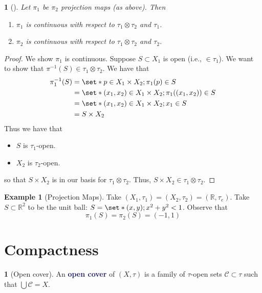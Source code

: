 \documentclass[11pt]{article}
\numberwithin{equation}{section}
\newcommand{\navy}[1]{\textcolor{MidnightBlue}{\bf #1}}
\theoremstyle{plain}
\newtheorem{claim}{\color{ForestGreen}{\textbf{Claim}}}[section]
\theoremstyle{definition}
\newtheorem{definition}{\color{MidnightBlue}{\textbf{Definition}}}[section]
\newtheorem{example}{\color{WildStrawberry}Example}[section]
\def\Set{\set*}%
\def\ss{\subset}
\newcommand{\1}{\mathbbm 1}
\def\t{\tau}
\newcommand{\RR}{\mathbb R}
\newcommand{\cC}{\mathcal C}
\begin{document}
\begin{claim}[]
	Let $\pi_1$ be $\pi_2$ projection maps (as above). Then
	\begin{enumerate}
		\item $\pi_1$ is continuous with respect to $\t_1 \otimes \t_2$ and $\t_1$.
		\item $\pi_2$ is continuous with respect to $\t_1 \otimes \t_2$ and $\t_2$.
	\end{enumerate}
\end{claim}
\begin{proof}
	We show $\pi_1$ is continuous. Suppose $S \ss X_1$ is open (i.e., $\in \t_1$). We want to show that $\pi^{-1}(S) \in \t_1 \otimes \t_2$. We have that
	\begin{align*}
		\pi_1^{-1}(S) &= \Set{p \in X_1 \times X_2; \pi_1(p) \in S} \\
		&= \Set{(x_1, x_2) \in X_1 \times X_2; \pi_1((x_1,x_2)) \in S} \\
		&= \Set{(x_1, x_2) \in X_1 \times X_2; x_1 \in S} \\
		&= S \times X_2
	\end{align*}
	Thus we have that
	\begin{itemize}
		\item $S$ is $\t_1$-open.
		\item $X_2$ is $\t_2$-open.
	\end{itemize}
	so that $S \times X_2$ is in our basis for $\t_1 \otimes \t_2$. Thus, $S \times X_2 \in \t_1 \otimes \t_2$.
	
\end{proof}


\begin{example}[Projection Maps]
	Take $(X_1,\t_1) = (X_2,\t_2) = (\RR, \t_e)$. Take $S \ss \RR^2$ to be the unit ball: $S = \Set{(x,y);x^2 + y^2 <1}$. Observe that
	\begin{equation}
		\pi_1(S) = \pi_2(S) = (-1,1)
	\end{equation}
\end{example}


\section{Compactness}

\begin{definition}[Open cover]
	An \navy{open cover} of $(X,\t)$ is a family of $\t$-open sets $\cC \ss \t$ such that $\bigcup \cC = X$. 
\end{definition}
\end{document}
